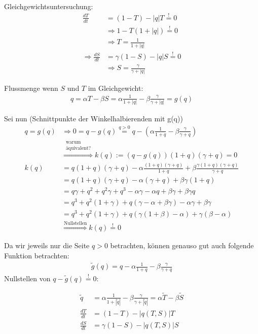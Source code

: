 \documentclass[11pt,a4paper]{article}
\begin{document}
	\newpage	
	
	Gleichgewichtsuntersuchung:
	\begin{align*}
		\frac{dT}{dt} &= \left(1 - T\right) - \left|q\right|T \stackrel{!}{=} 0 \\
		&\Rightarrow 1 - T\left(1 + |q|\right) \stackrel{!}{=} 0 \\
		&\Rightarrow T = \frac{1}{1+|q|} \\
		\Rightarrow \frac{dS}{dt} &= \gamma \left(1 - S\right) - \left|q\right|S \stackrel{!}{=} 0 \\
		&\Rightarrow S = \frac{\gamma}{\gamma + |q|}
	\end{align*}
	
	Flussmenge wenn \(S\) und \(T\) im Gleichgewicht:
	\begin{align*}
		q = \alpha T - \beta S
		 = \alpha \frac{1}{1+|q|} - \beta \frac{\gamma}{\gamma + |q|} = g(q)
	\end{align*}
	
	Sei nun (Schnittpunkte der Winkelhalbierenden mit g(q))
	\begin{align*}
		q = g(q) &\Rightarrow 0 = q - g(q) \stackrel{q > 0}{=}  q - \left(\alpha \frac{1}{1+q} - \beta \frac{\gamma}{\gamma + q} \right) \\
		& \stackrel{\substack{\textrm{warum}\\\textrm{äquivalent?}}}{\Rightarrow}
		k(q) := \left( q - g(q) \right) (1+q) (\gamma + q) = 0 \\
		k(q) &= q(1+q) (\gamma + q) - \alpha \frac{(1+q) (\gamma + q)}{1+q} + \beta \frac{\gamma (1+q) (\gamma + q)}{\gamma + q} \\
		&= q(1+q) (\gamma + q) - \alpha (\gamma + q) + \beta \gamma (1+q) \\
		&= q \gamma + q^2 + q^2 \gamma + q^3 - \alpha \gamma - \alpha q + \beta \gamma + \beta \gamma q \\
		&= q^3 + q^2(1 + \gamma) + q(\gamma - \alpha + \beta \gamma) - \alpha \gamma + \beta \gamma \\
		&= q^3 + q^2(1 + \gamma) + q\left(\gamma \left(1 + \beta\right) - \alpha \right) + \gamma \left( \beta - \alpha \right) \\
		& \stackrel{\textrm{Nullstellen}}{\Rightarrow} k(q) \stackrel{!}{=} 0
	\end{align*}
	
	Da wir jeweils nur die Seite \(q > 0\) betrachten, können genauso gut auch folgende Funktion betrachten:
	\begin{align*}
		\tilde{g}(q) = q - \alpha \frac{1}{1+q} - \beta \frac{\gamma}{\gamma + q}
	\end{align*}
	Nullstellen von \(q - \tilde{g}(q) \stackrel{!}{=} 0\):
	
	\newpage
	\begin{align*}
		\tilde{q} &= \alpha \frac{1}{1+ |\tilde{q}| } - \beta \frac{\gamma}{\gamma + |\tilde{q}| } = \alpha \tilde{T} - \beta \tilde{S} \\
		\frac{dT}{dt} &= (1 - T) - |q(T,S)|T \\
		\frac{dS}{dt} &= \gamma(1 - S) - |q(T,S)|S \\
	\end{align*}		
	
\end{document}
